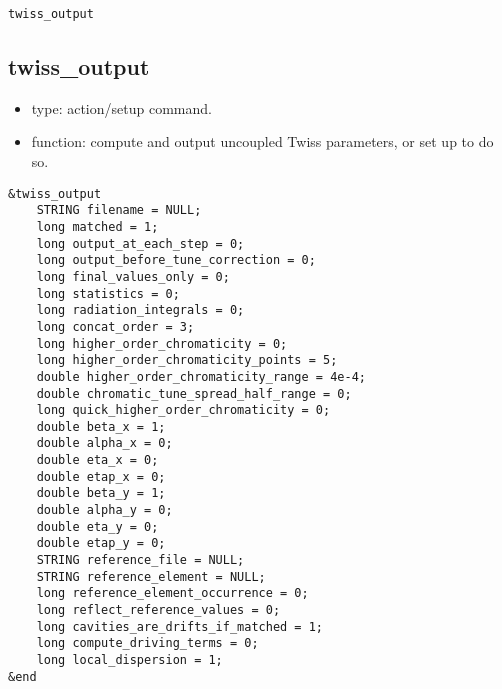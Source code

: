 \documentclass[11pt]{article}
\begin{document}
\begin{latexonly}
\newpage
\begin{center}{\Large\verb|twiss_output|}\end{center}
\end{latexonly}
\subsection{twiss\_output \label{subsec:twissoutput}}

\begin{itemize}
\item type: action/setup command.
\item function: compute and output uncoupled Twiss parameters, or set up to do so.
\end{itemize}

\begin{verbatim}
&twiss_output
    STRING filename = NULL;
    long matched = 1;
    long output_at_each_step = 0;
    long output_before_tune_correction = 0;
    long final_values_only = 0;
    long statistics = 0;
    long radiation_integrals = 0;
    long concat_order = 3;
    long higher_order_chromaticity = 0;
    long higher_order_chromaticity_points = 5;
    double higher_order_chromaticity_range = 4e-4;
    double chromatic_tune_spread_half_range = 0;
    long quick_higher_order_chromaticity = 0;
    double beta_x = 1;
    double alpha_x = 0;
    double eta_x = 0;
    double etap_x = 0;
    double beta_y = 1;
    double alpha_y = 0;
    double eta_y = 0;
    double etap_y = 0;
    STRING reference_file = NULL;
    STRING reference_element = NULL;
    long reference_element_occurrence = 0;
    long reflect_reference_values = 0;
    long cavities_are_drifts_if_matched = 1;
    long compute_driving_terms = 0;
    long local_dispersion = 1;
&end
\end{verbatim}
\end{document}
